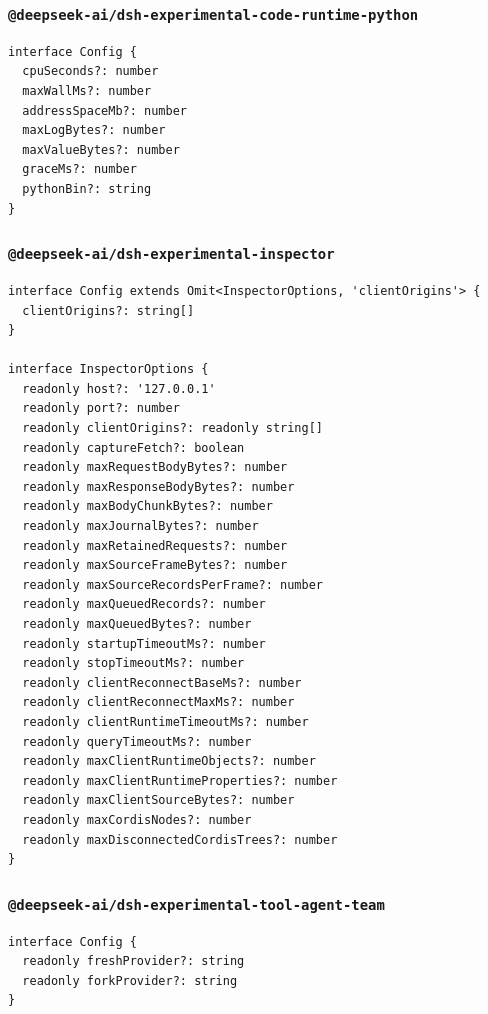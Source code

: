 \documentclass[11pt,a4paper]{article}
\begin{document}
\subsubsection*{\texttt{@deepseek-ai/dsh-experimental-code-runtime-python}}


\begin{lstlisting}
interface Config {
  cpuSeconds?: number
  maxWallMs?: number
  addressSpaceMb?: number
  maxLogBytes?: number
  maxValueBytes?: number
  graceMs?: number
  pythonBin?: string
}
\end{lstlisting}


\subsubsection*{\texttt{@deepseek-ai/dsh-experimental-inspector}}


\begin{lstlisting}
interface Config extends Omit<InspectorOptions, 'clientOrigins'> {
  clientOrigins?: string[]
}

interface InspectorOptions {
  readonly host?: '127.0.0.1'
  readonly port?: number
  readonly clientOrigins?: readonly string[]
  readonly captureFetch?: boolean
  readonly maxRequestBodyBytes?: number
  readonly maxResponseBodyBytes?: number
  readonly maxBodyChunkBytes?: number
  readonly maxJournalBytes?: number
  readonly maxRetainedRequests?: number
  readonly maxSourceFrameBytes?: number
  readonly maxSourceRecordsPerFrame?: number
  readonly maxQueuedRecords?: number
  readonly maxQueuedBytes?: number
  readonly startupTimeoutMs?: number
  readonly stopTimeoutMs?: number
  readonly clientReconnectBaseMs?: number
  readonly clientReconnectMaxMs?: number
  readonly clientRuntimeTimeoutMs?: number
  readonly queryTimeoutMs?: number
  readonly maxClientRuntimeObjects?: number
  readonly maxClientRuntimeProperties?: number
  readonly maxClientSourceBytes?: number
  readonly maxCordisNodes?: number
  readonly maxDisconnectedCordisTrees?: number
}
\end{lstlisting}


\subsubsection*{\texttt{@deepseek-ai/dsh-experimental-tool-agent-team}}


\begin{lstlisting}
interface Config {
  readonly freshProvider?: string
  readonly forkProvider?: string
}
\end{lstlisting}
\end{document}
